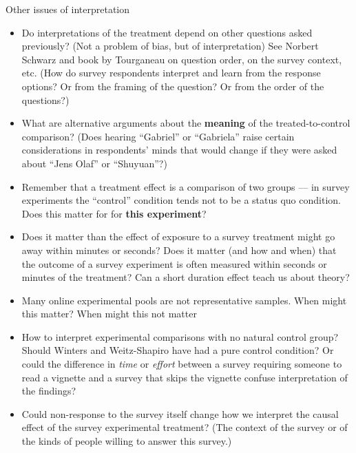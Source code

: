 \documentclass[
  ignorenonframetext,
]{beamer}
\providecommand{\tightlist}{%
  \setlength{\itemsep}{0pt}\setlength{\parskip}{0pt}}
\begin{document}
\begin{frame}[allowframebreaks]{Other issues of interpretation}
\protect\hypertarget{other-issues-of-interpretation}{}
\begin{itemize}
\tightlist
\item
  Do interpretations of the treatment depend on other questions asked
  previously? (Not a problem of bias, but of interpretation) See Norbert
  Schwarz and book by Tourganeau on question order, on the survey
  context, etc. (How do survey respondents interpret and learn from the
  response options? Or from the framing of the question? Or from the
  order of the questions?)
\item
  What are alternative arguments about the \textbf{meaning} of the
  treated-to-control comparison? (Does hearing ``Gabriel'' or
  ``Gabriela'' raise certain considerations in respondents' minds that
  would change if they were asked about ``Jens Olaf'' or ``Shuyuan''?)
\item
  Remember that a treatment effect is a comparison of two groups --- in
  survey experiments the ``control'' condition tends not to be a status
  quo condition. Does this matter for for \textbf{this experiment}?
\item
  Does it matter than the effect of exposure to a survey treatment might
  go away within minutes or seconds? Does it matter (and how and when)
  that the outcome of a survey experiment is often measured within
  seconds or minutes of the treatment? Can a short duration effect teach
  us about theory?
\item
  Many online experimental pools are not representative samples. When
  might this matter? When might this not matter
\item
  How to interpret experimental comparisons with no natural control
  group? Should Winters and Weitz-Shapiro have had a pure control
  condition? Or could the difference in \emph{time} or \emph{effort}
  between a survey requiring someone to read a vignette and a survey
  that skips the vignette confuse interpretation of the findings?
\item
  Could non-response to the survey itself change how we interpret the
  causal effect of the survey experimental treatment? (The context of
  the survey or of the kinds of people willing to answer this survey.)
\end{itemize}
\end{frame}
\end{document}
